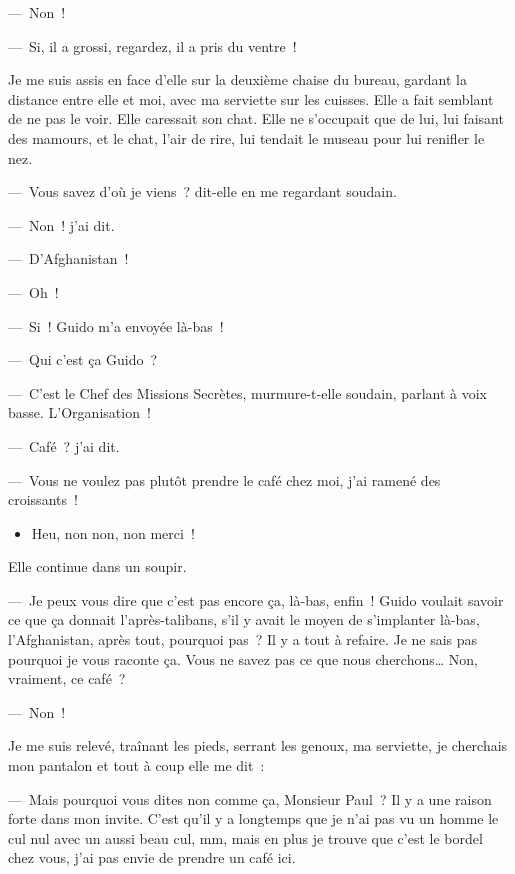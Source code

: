 \documentclass[french,twoside]{book} %
\begin{document}
— Non !\par
— Si, il a grossi, regardez, il a pris du ventre !\par
Je me suis assis en face d’elle sur la deuxième chaise du bureau, gardant la distance entre elle et moi, avec ma serviette sur les cuisses. Elle a fait semblant de ne pas le voir. Elle caressait son chat. Elle ne s’occupait que de lui, lui faisant des mamours, et le chat, l’air de rire, lui tendait le museau pour lui renifler le nez.\par
— Vous savez d’où je viens ? dit-elle en me regardant soudain.\par
— Non ! j’ai dit.\par
— D’Afghanistan !\par
— Oh !\par
— Si ! Guido m’a envoyée là-bas !\par
— Qui c’est ça Guido ?\par
— C’est le Chef des Missions Secrètes, murmure-t-elle soudain, parlant à voix basse. L’Organisation !\par
— Café ? j’ai dit.\par
— Vous ne voulez pas plutôt prendre le café chez moi, j’ai ramené des croissants !\par

\begin{itemize}[itemsep=0pt,topsep=0pt,partopsep=0pt,parskip=0pt]
\item Heu, non non, non merci !
\end{itemize}

Elle continue dans un soupir.\par
— Je peux vous dire que c’est pas encore ça, là-bas, enfin ! Guido voulait savoir ce que ça donnait l’après-talibans, s’il y avait le moyen de s’implanter là-bas, l’Afghanistan, après tout, pourquoi pas ? Il y a tout à refaire. Je ne sais pas pourquoi je vous raconte ça. Vous ne savez pas ce que nous cherchons… Non, vraiment, ce café ?\par
— Non !\par
Je me suis relevé, traînant les pieds, serrant les genoux, ma serviette, je cherchais mon pantalon et tout à coup elle me dit :\par
— Mais pourquoi vous dites non comme ça, Monsieur Paul ? Il y a une raison forte dans mon invite. C’est qu’il y a longtemps que je n’ai pas vu un homme le cul nul avec un aussi beau cul, mm, mais en plus je trouve que c’est le bordel chez vous, j’ai pas envie de prendre un café ici.
\end{document}
